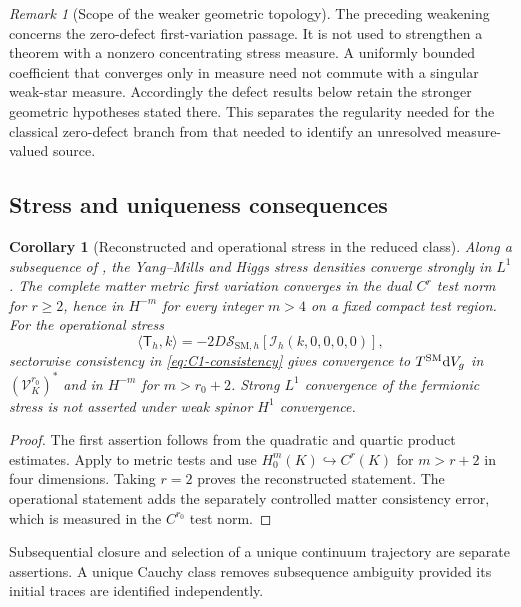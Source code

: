 \documentclass[11pt]{article}
\numberwithin{equation}{section}
\newtheorem{corollary}[corollary]{Corollary}
\theoremstyle{definition}
\theoremstyle{remark}
\newtheorem{remark}[remark]{Remark}
\newcommand{\dd}{\mathrm d}
\newcommand{\Sact}{\mathscr S}
\newcommand{\Vtest}{\mathscr V}
\newcommand{\dV}{\dd V}
\begin{document}
\begin{remark}[Scope of the weaker geometric topology]
\label{rem:weaker-geometry-scope}
The preceding weakening concerns the zero-defect first-variation passage.
It is not used to strengthen a theorem with a nonzero concentrating stress
measure.  A uniformly bounded coefficient that converges only in measure
need not commute with a singular weak-star measure.  Accordingly the defect
results below retain the stronger geometric hypotheses stated there.  This
separates the regularity needed for the classical zero-defect branch from
that needed to identify an unresolved measure-valued source.
\end{remark}

\subsection{Stress and uniqueness consequences}

\begin{corollary}[Reconstructed and operational stress in the reduced class]
\label{cor:reduced-stress}
Along a subsequence of , the Yang--Mills and Higgs
stress densities converge strongly in $L^1$.  The complete matter metric
first variation converges in the dual $C^r$ test norm for $r\ge2$, hence in
$H^{-m}$ for every integer $m>4$ on a fixed compact test region.  For the
operational stress
\[
 \langle\mathsf T_h,k\rangle
 =-2D\Sact_{\mathrm{SM},h}[\mathcal I_h(k,0,0,0,0)],
\]
sectorwise consistency in \eqref{eq:C1-consistency} gives convergence to
$T^{\rm SM}\dV_g$ in $(\Vtest_K^{r_0})^*$ and in $H^{-m}$ for $m>r_0+2$.
Strong $L^1$ convergence of the fermionic stress is not asserted under weak
spinor $H^1$ convergence.
\end{corollary}
\begin{proof}
The first assertion follows from the quadratic and quartic product
estimates.  Apply  to metric tests and use
$H_0^m(K)\hookrightarrow C^r(K)$ for $m>r+2$ in four dimensions.
Taking $r=2$ proves the reconstructed statement.  The operational statement
adds the separately controlled matter consistency error, which is measured
in the $C^{r_0}$ test norm.
\end{proof}

Subsequential closure and selection of a unique continuum trajectory are
separate assertions. A unique Cauchy class removes subsequence ambiguity
provided its initial traces are identified independently.
\end{document}
